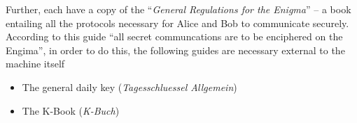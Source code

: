 Further, each have a copy of the ``\emph{General Regulations for the
Enigma}'' -- a book entailing all the protocols necessary for Alice
and Bob to communicate securely. According to this guide ``all secret
communcations are to be enciphered on the Engima'', in order to do
this, the following guides are necessary external to the machine itself
\begin{itemize}
  \item The general daily key (\emph{Tagesschluessel Allgemein})
  \item The K-Book (\emph{K-Buch})
\end{itemize}



